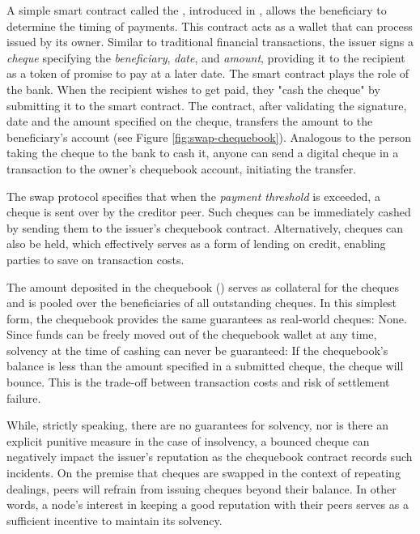 A simple smart contract called the , introduced in \citet{ethersphere2016sw3}, allows the beneficiary to determine the timing of payments. This contract acts as a wallet that can process  issued by its owner. Similar to traditional financial transactions, the issuer signs a \emph{cheque} specifying the \emph{beneficiary}, \emph{date}, and \emph{amount}, providing it to the recipient as a token of promise to pay at a later date. The smart contract plays the role of the bank. When the recipient wishes to get paid, they "cash the cheque" by submitting it to the smart contract. The contract, after validating the signature, date and the amount specified on the cheque, transfers the amount to the beneficiary's account (see Figure \ref{fig:swap-chequebook}). Analogous to the person taking the cheque to the bank to cash it, anyone can send a digital cheque in a transaction to the owner's chequebook account, initiating the transfer. 

The swap protocol specifies that when the \emph{payment threshold} is exceeded, a cheque is sent over by the creditor peer. Such cheques can be immediately cashed by sending them to the issuer's chequebook contract. Alternatively, cheques can also be held, which effectively serves as a form of lending on credit, enabling parties to save on transaction costs. 

The amount deposited in the chequebook () serves as collateral for the cheques and is pooled over the beneficiaries of all outstanding cheques. In this simplest form, the chequebook provides the same guarantees as real-world cheques: None. Since funds can be freely moved out of the chequebook wallet at any time, solvency at the time of cashing can never be guaranteed: If the chequebook's balance is less than the amount specified in a submitted cheque, the cheque will bounce. This is the trade-off between transaction costs and risk of settlement failure.

While, strictly speaking, there are no guarantees for solvency, nor is there an explicit punitive measure in the case of insolvency, a bounced cheque can negatively impact the issuer's reputation as the chequebook contract records such incidents. On the premise that cheques are swapped in the context of repeating dealings, peers will refrain from issuing cheques beyond their balance. In other words, a node's interest in keeping a good reputation with their peers serves as a sufficient incentive to maintain its solvency.


